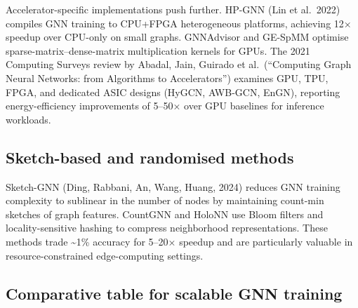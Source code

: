 Accelerator-specific implementations push further. HP-GNN (Lin et al.~2022) compiles GNN training to CPU+FPGA heterogeneous platforms, achieving 12× speedup over CPU-only on small graphs. GNNAdvisor and GE-SpMM optimise sparse-matrix--dense-matrix multiplication kernels for GPUs. The 2021 Computing Surveys review by Abadal, Jain, Guirado et al.~(``Computing Graph Neural Networks: from Algorithms to Accelerators'') examines GPU, TPU, FPGA, and dedicated ASIC designs (HyGCN, AWB-GCN, EnGN), reporting energy-efficiency improvements of 5--50× over GPU baselines for inference workloads.

\subsection{Sketch-based and randomised methods}\label{sketch-based-and-randomised-methods}

Sketch-GNN (Ding, Rabbani, An, Wang, Huang, 2024) reduces GNN training complexity to sublinear in the number of nodes by maintaining count-min sketches of graph features. CountGNN and HoloNN use Bloom filters and locality-sensitive hashing to compress neighborhood representations. These methods trade \textasciitilde1\% accuracy for 5--20× speedup and are particularly valuable in resource-constrained edge-computing settings.

\subsection{Comparative table for scalable GNN training}\label{comparative-table-for-scalable-gnn-training}


